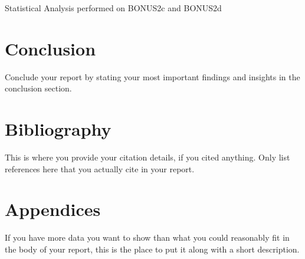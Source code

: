 \documentclass[11pt]{article}
\newcommand{\tablecaption}[1]{\caption{Statistical Analysis performed on {#1}}}
\begin{document}
\begin{table}[H] 
\tablecaption{BONUS2c and BONUS2d}        
\label{b2c_b2d}                 
\end{table}

\section{Conclusion}
Conclude your report by stating your most important findings and insights in the conclusion
section.

\section{Bibliography}
This is where you provide your citation details, if you cited anything. Only list references
here that you actually cite in your report.

\section{Appendices}
If you have more data you want to show than what you could reasonably fit in the body
of your report, this is the place to put it along with a short description.
\end{document}
